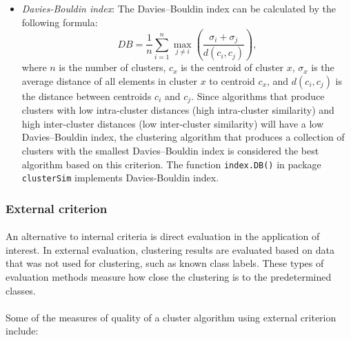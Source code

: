 \documentclass[10pt]{article}\usepackage[]{graphicx}\usepackage[]{color}
\begin{document}
\begin{itemize}
\item \textit{Davies-Bouldin index}:
\newline \newline The Davies–Bouldin index can be calculated by the following formula:
$$DB = \frac {1} {n} \sum_{i=1}^{n} \max_{j\neq i}\left(\frac{\sigma_i + \sigma_j} {d(c_i,c_j)}\right),$$
where $n$ is the number of clusters, $c_x$ is the centroid of cluster $x$, $\sigma_x$ is the average distance of all elements in cluster $x$ to centroid $c_x$, and $d(c_i,c_j)$ is the distance between centroids $c_i$ and $c_j$. 
\newline \newline
Since algorithms that produce clusters with low intra-cluster distances (high intra-cluster similarity) and high inter-cluster distances (low inter-cluster similarity) will have a low Davies–Bouldin index, the clustering algorithm that produces a collection of clusters with the smallest Davies–Bouldin index is considered the best algorithm based on this criterion.
\newline \newline
The function \texttt{index.DB()} in package \texttt{clusterSim} implements Davies-Bouldin index.
\end{itemize}



\subsubsection{External criterion}
\paragraph{}
An alternative to internal criteria is direct evaluation in the application of interest. In external evaluation, clustering results are evaluated based on data that was not used for clustering, such as known class labels. These types of evaluation methods measure how close the clustering is to the predetermined classes. 
\paragraph{}
Some of the measures of quality of a cluster algorithm using external criterion include:
\end{document}
